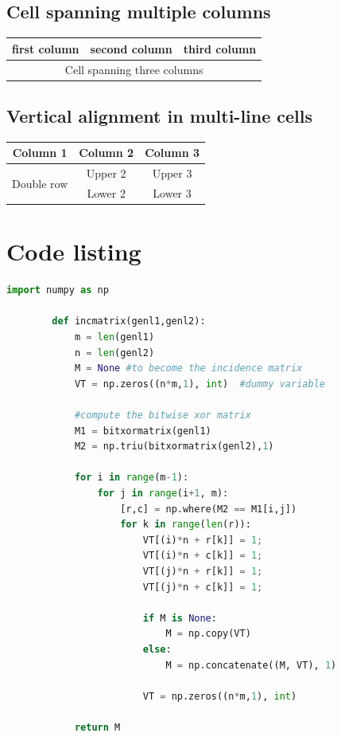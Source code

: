 \documentclass[a4paper]{report}
\begin{document}
\section{Cell spanning multiple columns}
    \begin{tabular}{|l|l|l|}
        \hline
        first column & second column & third column \\
        \hline
        \multicolumn{3}{|c|}{Cell spanning three columns} \\
        \hline
    \end{tabular}

\section{Vertical alignment in multi-line cells}
    \begin{table}[!h]
          \begin{tabular}{|c|c|c|} \hline
            Column 1 & Column 2 & Column 3 \\ \hline
            \multirow{2}{*}{Double row} & Upper 2 & Upper 3 \\ 
            & Lower 2 & Lower 3 \\ \hline             
          \end{tabular}
        \label{tab:multirow}
      \end{table}

    
\chapter{Code listing}\cite{sen2005cute}
    \begin{lstlisting}[language=Python]
        import numpy as np
            
        def incmatrix(genl1,genl2):
            m = len(genl1)
            n = len(genl2)
            M = None #to become the incidence matrix
            VT = np.zeros((n*m,1), int)  #dummy variable
            
            #compute the bitwise xor matrix
            M1 = bitxormatrix(genl1)
            M2 = np.triu(bitxormatrix(genl2),1) 
        
            for i in range(m-1):
                for j in range(i+1, m):
                    [r,c] = np.where(M2 == M1[i,j])
                    for k in range(len(r)):
                        VT[(i)*n + r[k]] = 1;
                        VT[(i)*n + c[k]] = 1;
                        VT[(j)*n + r[k]] = 1;
                        VT[(j)*n + c[k]] = 1;
                        
                        if M is None:
                            M = np.copy(VT)
                        else:
                            M = np.concatenate((M, VT), 1)
                        
                        VT = np.zeros((n*m,1), int)
            
            return M
    \end{lstlisting}
\end{document}
